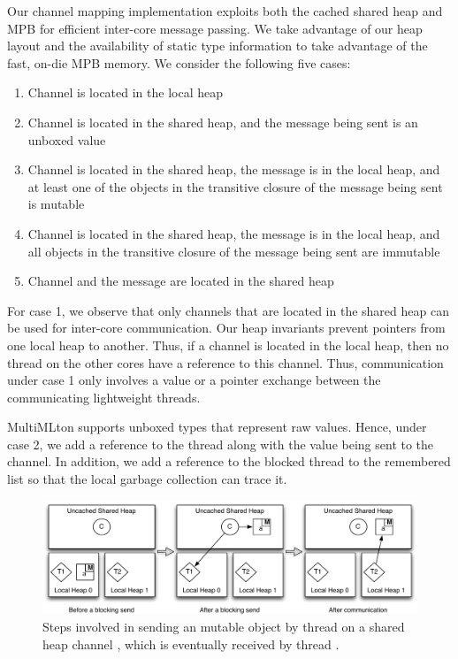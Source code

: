 Our channel mapping implementation exploits both the cached shared heap and MPB
for efficient inter-core message passing. We take advantage of our heap layout
and the availability of static type information to take advantage of the fast,
on-die MPB memory. We consider the following five cases:

\begin{enumerate}
\item Channel is located in the local heap
\item Channel is located in the shared heap, and the message being sent is an
unboxed value
\item Channel is located in the shared heap, the message is in the local heap,
and at least one of the objects in the transitive closure of the message being
sent is mutable
\item Channel is located in the shared heap, the message is in the local heap,
and all objects in the transitive closure of the message being sent are
immutable
\item Channel and the message are located in the shared heap
\end{enumerate}

For case 1, we observe that only channels that are located in the shared heap
can be used for inter-core communication. Our heap invariants prevent pointers
from one local heap to another. Thus, if a channel is located in the local
heap, then no thread on the other cores have a reference to this channel. Thus,
communication under case 1 only involves a value or a pointer exchange between
the communicating lightweight threads.

MultiMLton supports unboxed types that represent raw values. Hence, under case
2, we add a reference to the thread along with the value being sent to the
channel. In addition, we add a reference to the blocked thread to the
remembered list so that the local garbage collection can trace it.

\begin{figure}[t]
\centering
\includegraphics[width=1\textwidth]{Figures/Comm_Case_3}
\caption{Steps involved in sending an mutable object  by thread 
on a shared heap channel , which is eventually received by thread
.}
\label{fig:comm_mutable}
\end{figure}

